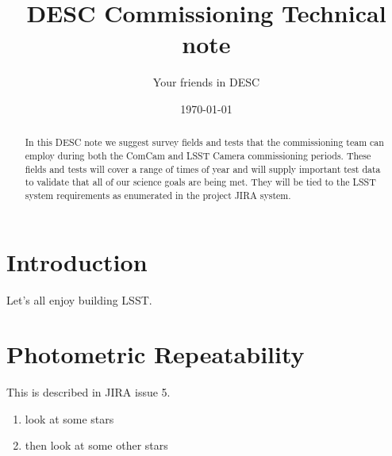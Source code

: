 \documentclass[modern]{lsstdescnote}
\begin{document}
\title{DESC Commissioning Technical note}
\author{Your friends in DESC}
\date{\today}


\begin{abstract}
  In this DESC note we suggest survey fields and tests that the
  commissioning team can employ during both the ComCam and LSST Camera
  commissioning periods.  These fields and tests will cover a range of
  times of year and will supply important test data to validate that
  all of our science goals are being met.  They will be tied to the
  LSST system requirements as enumerated in the project JIRA system.
\end{abstract}

\maketitle

\noindent
\begin{center}
  \fboxsep=5pt  
 \end{center} 
\vspace{0.1in}

\section{Introduction}

Let's all enjoy building LSST.

\section{Photometric Repeatability}

This is described in JIRA issue 5.

\begin{enumerate}
\item look at some stars
\item then look at some other stars
\end{enumerate}

\begin{acknowledgments}

\end{acknowledgments}
  

\end{document}
